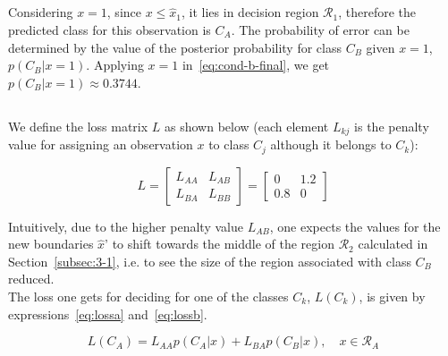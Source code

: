 \documentclass[paper=a4, fontsize=11pt]{scrartcl} %
\numberwithin{equation}{section} %
\numberwithin{figure}{section} %
\numberwithin{table}{section} %
\begin{document}
\subsection{}
\label{subsec:3-2}

Considering $x = 1$, since $x \le \hat{x}_1$, it lies in decision region 
$\mathcal{R}_{1}$, therefore the predicted class for this observation is 
$C_A$. The probability of error can be determined by the value of the posterior 
probability for class $C_B$ given $x = 1$, $p(C_B|x = 1)$. Applying $x = 1$ 
in~\ref{eq:cond-b-final}, we get $p(C_B|x = 1) \approx 0.3744$.

\subsection{}

We define the loss matrix $L$ as shown below (each element $L_{kj}$ is the 
penalty value for assigning an observation $x$ to class $C_j$ although it 
belongs to $C_k$):

\begin{equation}
    L = \begin{bmatrix} L_{AA} & L_{AB} \\ L_{BA} & L_{BB} \end{bmatrix} = \begin{bmatrix} 0 & 1.2 \\ 0.8 & 0 \end{bmatrix}
    \label{eq:loss-matrix}
\end{equation}

Intuitively, due to the higher penalty value $L_{AB}$, one expects the 
values for the new boundaries $\hat{x}$' to shift towards the middle of the 
region $\mathcal{R}_{2}$ calculated in Section~\ref{subsec:3-1}, i.e. to 
see the size of the region associated with class $C_B$ reduced.\\

The loss one gets for deciding for one of the classes $C_k$, $L(C_k)$, is given 
by expressions~\ref{eq:lossa} and~\ref{eq:lossb}.

\begin{equation}
    L(C_A) = L_{AA}p(C_A|x) + L_{BA}p(C_B|x), \quad x \in \mathcal{R}_{A} %
    \label{eq:lossa}
\end{equation}
\end{document}
